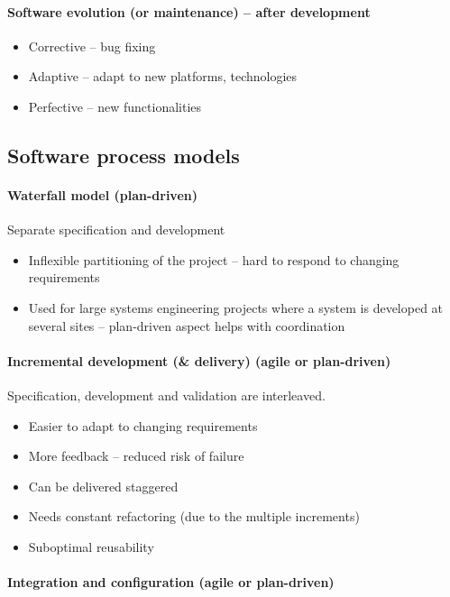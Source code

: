 \documentclass[../ESOF_notes.tex]{subfiles}
\begin{document}
\paragraph{Software evolution (or maintenance) – after development}
\begin{itemize}
    \item Corrective – bug fixing
    \item Adaptive – adapt to new platforms, technologies
    \item Perfective – new functionalities
\end{itemize}

\subsection{Software process models}
\paragraph{Waterfall model (plan-driven)} 

Separate specification and development

\begin{itemize}
    \item Inflexible partitioning of the project – hard to respond to changing requirements
    \item Used for large systems engineering projects where a system is developed at several sites – plan-driven aspect helps with coordination
\end{itemize}

\paragraph{Incremental development (\& delivery) (agile or plan-driven)} 

Specification, development and validation are interleaved.

\begin{itemize}
    \item Easier to adapt to changing requirements
    \item More feedback – reduced risk of failure
    \item Can be delivered staggered
    \item Needs constant refactoring (due to the multiple increments)
    \item Suboptimal reusability
\end{itemize}

\paragraph{Integration and configuration (agile or plan-driven)} 
\end{document}
